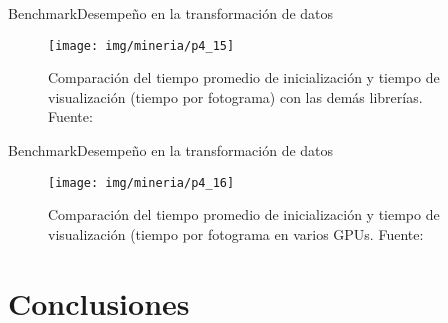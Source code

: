 \documentclass[10pt]{beamer}
\newcommand{\1}{
	\setbeamertemplate{background}{
		\texttt{[image: img/1]}
		\tikz[overlay] \fill[fill opacity=0.75,fill=white] (0,0) rectangle (-\paperwidth,\paperheight);
	}
}
\begin{document}
\begin{frame}{Benchmark}{Desempeño en la transformación de datos}
	\begin{figure}[]
		\centering
		\texttt{[image: img/mineria/p4\_15]}
		\caption{Comparación del tiempo promedio de inicialización y tiempo de visualización (tiempo por fotograma) con las demás librerías. Fuente: \cite{li2018p4}}
	\end{figure}
\end{frame}

\begin{frame}{Benchmark}{Desempeño en la transformación de datos}
	\begin{figure}[]
		\centering
		\texttt{[image: img/mineria/p4\_16]}
		\caption{Comparación del tiempo promedio de inicialización y tiempo de visualización (tiempo por fotograma en varios GPUs. Fuente: \cite{li2018p4}}
	\end{figure}
\end{frame}


\section{Conclusiones}
\end{document}
